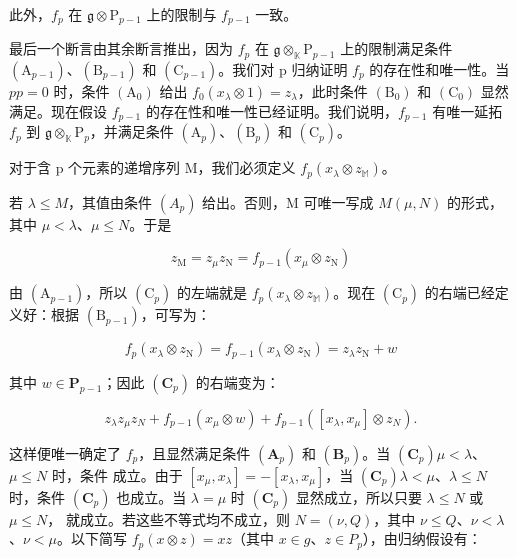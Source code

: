此外，\(f_{p}\) 在 \(\mathfrak{g} \otimes \mathrm{P}_{p-1}\) 上的限制与 \(f_{p-1}\) 一致。

最后一个断言由其余断言推出，因为 \(f_{p}\) 在 \(\mathfrak{g} \otimes_{\mathbb{K}} \mathrm{P}_{p-1}\) 上的限制满足条件 \((\mathrm{A}_{p-1})\)、\((\mathrm{B}_{p-1})\) 和 \((\mathrm{C}_{p-1})\)。我们对 p 归纳证明 \(f_{p}\) 的存在性和唯一性。当 \(p\)\(p = 0\) 时，条件 \((\mathrm{A}_0)\) 给出 \(f_0(x_\lambda \otimes 1) = z_\lambda\)，此时条件 \((\mathrm{B}_0)\) 和 \((\mathrm{C}_0)\) 显然满足。现在假设 \(f_{p-1}\) 的存在性和唯一性已经证明。我们说明，\(f_{p-1}\) 有唯一延拓 \(f_{p}\) 到 \(\mathfrak{g} \otimes_{\mathbb{K}} \mathrm{P}_{p}\)，并满足条件 \((\mathrm{A}_{p})\)、\((\mathrm{B}_{p})\) 和 \((\mathrm{C}_{p})\)。

对于含 p 个元素的递增序列 M，我们必须定义 \(f_{p}(x_{\lambda} \otimes z_{\mathbb{M}})\)。

若 \(\lambda \leqslant M\)，其值由条件 \((A_p)\) 给出。否则，M 可唯一写成 \(M\)\((\mu, N)\) 的形式，其中 \(\mu < \lambda\)、\(\mu \leqslant N\)。于是

\[
z _ {\mathrm{M}} = z _ {\mu} z _ {\mathrm{N}} = f _ {p - 1} (x _ {\mu} \otimes z _ {\mathrm{N}})
\]

由 \((\mathrm{A}_{p - 1})\)，所以 \((\mathrm{C}_p)\) 的左端就是 \(f_{p}(x_{\lambda}\otimes z_{\mathbb{M}})\)。现在 \((\mathrm{C}_p)\) 的右端已经定义好：根据 \((\mathrm{B}_{p - 1})\)，可写为：

\[
f _ {p} (x _ {\lambda} \otimes z _ {\mathrm{N}}) = f _ {p - 1} (x _ {\lambda} \otimes z _ {\mathrm{N}}) = z _ {\lambda} z _ {\mathrm{N}} + w
\]

其中 \(w \in \mathbf{P}_{p-1}\)；因此 \((\mathbf{C}_p)\) 的右端变为：

\[
z _ {\lambda} z _ {\mu} z _ {N} + f _ {p - 1} (x _ {\mu} \otimes w) + f _ {p - 1} ([ x _ {\lambda}, x _ {\mu} ] \otimes z _ {N}).
\]

这样便唯一确定了 \(f_{p}\)，且显然满足条件 \((\mathbf{A}_{p})\) 和 \((\mathbf{B}_{p})\)。当 \((\mathbf{C}_{p})\)\(\mu < \lambda\)、\(\mu \leqslant N\) 时，条件  成立。由于 \([x_{\mu}, x_{\lambda}] = -[x_{\lambda}, x_{\mu}]\)，当 \((\mathbf{C}_{p})\)\(\lambda < \mu\)、\(\lambda \leqslant N\) 时，条件 \((\mathbf{C}_{p})\) 也成立。当 \(\lambda = \mu\) 时 \((\mathbf{C}_{p})\) 显然成立，所以只要 \(\lambda \leqslant N\) 或 \(\mu \leqslant N\)， 就成立。若这些不等式均不成立，则 \(N = (\nu, Q)\)，其中 \(\nu \leqslant Q\)、\(\nu < \lambda\)、\(\nu < \mu\)。以下简写 \(f_{p}(x \otimes z) = xz\)（其中 \(x \in g\)、\(z \in P_{p}\)），由归纳假设有：

